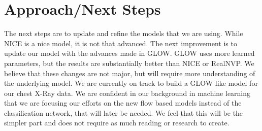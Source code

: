 \section{Approach/Next Steps}
The next steps are to update and refine the models that we are using. While NICE
is a nice model, it is not that advanced. The next improvement is to update our
model with the advances made in GLOW. GLOW uses more learned parameters, but the
results are substantially better than NICE or RealNVP. We believe that these
changes are not major, but will require more understanding of the underlying
model. We are currently on track to build a GLOW like model for our chest X-Ray
data. We are confident in our background in machine learning that we are
focusing our efforts on the new flow based models instead of the classification
network, that will later be needed. We feel that this will be the simpler part
and does not require as much reading or research to create. 

